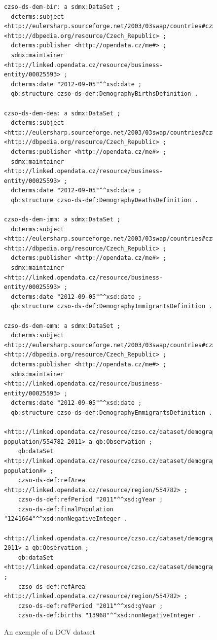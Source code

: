 \begin{figure}
\begin{verbatim}
czso-ds-dem-bir: a sdmx:DataSet ;
  dcterms:subject <http://eulersharp.sourceforge.net/2003/03swap/countries#cz>, <http://dbpedia.org/resource/Czech_Republic> ;
  dcterms:publisher <http://opendata.cz/me#> ;
  sdmx:maintainer <http://linked.opendata.cz/resource/business-entity/00025593> ;
  dcterms:date "2012-09-05"^^xsd:date ;
  qb:structure czso-ds-def:DemographyBirthsDefinition .
  
czso-ds-dem-dea: a sdmx:DataSet ;
  dcterms:subject <http://eulersharp.sourceforge.net/2003/03swap/countries#cz>, <http://dbpedia.org/resource/Czech_Republic> ;
  dcterms:publisher <http://opendata.cz/me#> ;
  sdmx:maintainer <http://linked.opendata.cz/resource/business-entity/00025593> ;
  dcterms:date "2012-09-05"^^xsd:date ;
  qb:structure czso-ds-def:DemographyDeathsDefinition .
  
czso-ds-dem-imm: a sdmx:DataSet ;
  dcterms:subject <http://eulersharp.sourceforge.net/2003/03swap/countries#cz>, <http://dbpedia.org/resource/Czech_Republic> ;
  dcterms:publisher <http://opendata.cz/me#> ;
  sdmx:maintainer <http://linked.opendata.cz/resource/business-entity/00025593> ;
  dcterms:date "2012-09-05"^^xsd:date ;
  qb:structure czso-ds-def:DemographyImmigrantsDefinition .
  
czso-ds-dem-emm: a sdmx:DataSet ;
  dcterms:subject <http://eulersharp.sourceforge.net/2003/03swap/countries#cz>, <http://dbpedia.org/resource/Czech_Republic> ;
  dcterms:publisher <http://opendata.cz/me#> ;
  sdmx:maintainer <http://linked.opendata.cz/resource/business-entity/00025593> ;
  dcterms:date "2012-09-05"^^xsd:date ;
  qb:structure czso-ds-def:DemographyEmmigrantsDefinition .
  
<http://linked.opendata.cz/resource/czso.cz/dataset/demography/final-population/554782-2011> a qb:Observation ;
    qb:dataSet <http://linked.opendata.cz/resource/czso.cz/dataset/demography/final-population#> ;
    czso-ds-def:refArea <http://linked.opendata.cz/resource/region/554782> ;
    czso-ds-def:refPeriod "2011"^^xsd:gYear ;
    czso-ds-def:finalPopulation "1241664"^^xsd:nonNegativeInteger .

<http://linked.opendata.cz/resource/czso.cz/dataset/demography/births/554782-2011> a qb:Observation ;
    qb:dataSet <http://linked.opendata.cz/resource/czso.cz/dataset/demography/births#> ;
    czso-ds-def:refArea <http://linked.opendata.cz/resource/region/554782> ;
    czso-ds-def:refPeriod "2011"^^xsd:gYear ;
    czso-ds-def:births "13968"^^xsd:nonNegativeInteger .
\end{verbatim}\normalsize
\caption{An exemple of a DCV dataset}
\label{fig:example-dcv-dataset}
\end{figure}

